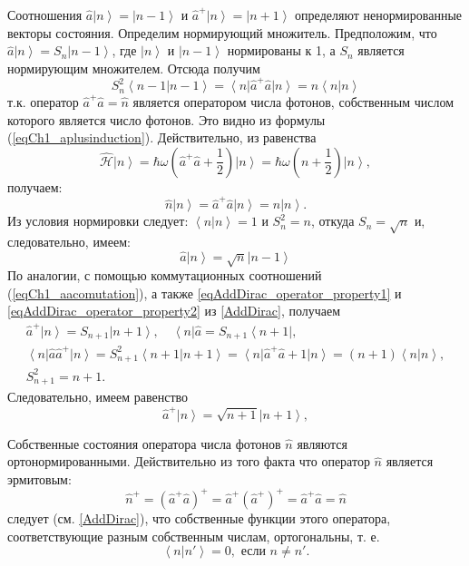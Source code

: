 Соотношения 
$\hat{a} \left|n\right> = \left|n - 1\right>$
и
$\hat{a}^{+} \left|n\right> = \left|n + 1\right>$
определяют ненормированные векторы состояния. Определим нормирующий
множитель. Предположим, что  
$\hat{a} \left|n\right> = S_n \left|n - 1\right>$,  где 
$\left|n\right>$ и $\left|n - 1\right>$ нормированы к  1,  а $S_n$
является нормирующим множителем. Отсюда получим 
\[
S_n^2\left<n - 1\right.\left|n - 1\right> =
\left<n\right|\hat{a}^{+}\hat{a}\left|n\right> = 
n  \left<n\right.\left|n\right>
\]
т.к. оператор    
$\hat{a}^{+}\hat{a} = \hat{n}$
является оператором числа фотонов, собственным числом
которого является число фотонов. Это видно из формулы
(\ref{eqCh1_aplusinduction}). Действительно, из равенства
\[
\hat{\mathcal{H}} \left|n\right> =
\hbar \omega \left(
\hat{a}^{+}\hat{a} + \frac{1}{2}
\right)
\left|n\right> = 
\hbar \omega \left(n + \frac{1}{2}\right)
\left|n\right>,
\]
получаем:
\[
\hat{n}\left|n\right> = \hat{a}^{+}\hat{a} \left|n\right> = n
\left|n\right>. 
\]
Из условия нормировки следует: $\left<n\right.\left|n\right> = 1$   и
$S_n^2 = n$,  откуда $S_n = \sqrt{n}$ и, следовательно, имеем: 
\begin{equation}
\hat{a}\left|n\right> = \sqrt{n}\left|n - 1\right>
\end{equation}
По аналогии, с помощью коммутационных соотношений
(\ref{eqCh1_aacomutation}), а также \ref{eqAddDirac_operator_property1} и
  \ref{eqAddDirac_operator_property2} из \autoref{AddDirac},
  получаем 
\begin{eqnarray}
\hat{a}^{+}\left|n\right> = S_{n+1}\left|n + 1\right>,
\quad 
\left<n\right|\hat{a} = S_{n + 1}\left<n + 1\right|,
\nonumber \\
\left<n\right|\hat{a}\hat{a}^{+}\left|n\right> = S_{n+1}^2
\left<n + 1\right|\left.n + 1\right> = 
\left<n\right|\hat{a}^{+}\hat{a} + 1\left|n\right> = 
\left(n + 1\right)\left<n\right.\left|n\right>,
\nonumber \\
S_{n+1}^2 = n + 1.
\end{eqnarray}
Следовательно, имеем равенство
\begin{equation}
\hat{a}^{+}\left|n\right> = \sqrt{n + 1}\left|n + 1\right>,
\end{equation}

Собственные состояния оператора числа фотонов $\hat{n}$ являются ортонормированными. 
Действительно из того факта что оператор $\hat{n}$ является эрмитовым:
\[
\hat{n}^{+} = \left(\hat{a}^{+}\hat{a}\right)^{+} = 
\hat{a}^{+} \left(\hat{a}^{+}\right)^{+} = 
\hat{a}^{+}\hat{a} = \hat{n}
\]
следует (см. \autoref{AddDirac}), что собственные функции этого оператора,
соответствующие разным собственным числам, ортогональны, т. е.
\begin{equation}
\left<n\right|\left.n'\right> = 0, \mbox{ если } n \ne n'.
\label{eqOrtoN}
\end{equation}

